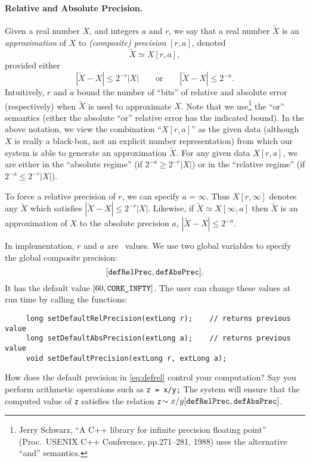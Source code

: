 \documentclass[12pt]{article}
\begin{document}
\paragraph{Relative and Absolute Precision.}
Given a real number $ X $, and integers $a$ and $r$, we say that a
real number $ \widetilde{X} $ is an
{\em approximation} of $X$ to {\em (composite) precision}
$ [r, a] $, denoted
\[
\widetilde{X} \simeq X \left[ r, a \right],
\]
provided either
\[
\left| \widetilde{X} - X \right| \le 2^{-r}\left| X \right|
	\qquad \mbox{or} \qquad
\left| \widetilde{X} - X \right| \le 2^{-a}.
\]
Intuitively, $r$ and $a$ bound the number of ``bits'' of relative and
absolute error (respectively) when $\widetilde{X}$ is used to approximate $X$.
Note that we use\footnote{
Jerry Schwarz, ``A C++ library for infinite precision
floating point'' (Proc.~USENIX C++ Conference, pp.271--281, 1988)
uses the alternative ``and'' semantics.
} the
``or'' semantics (either the absolute ``or'' relative error has the
indicated bound).  In the above notation, we view the combination
``$X[r,a]$'' as the given data (although $X$ is really a black-box,
not an explicit number representation)
from which our system is able to generate an approximation $\widetilde{X}$.
For any given data $X[r,a]$, we are either in the ``absolute regime''
(if $2^{-a}\ge 2^{-r}|X|$) or in the ``relative regime''
(if $2^{-a}\le 2^{-r}|X|$).

To force a relative precision of $ r $, we can
specify $a = \infty $.  Thus $ X[r, \infty]$ denotes any
$\widetilde{X}$ which satisfies
$\left| \widetilde{X} - X \right| \le 2^{-r}\left| X \right|$.
Likewise, if $ \widetilde{X} \simeq X[\infty, a] $ then $ \widetilde{X} $ is
an approximation of $ X $ to the absolute precision $a$,
$|\widetilde{X} - X| \le 2^{-a}$.

In implementation, $r$ and $a$ are \extlong\ values.
We use two global variables to specify the global composite precision:
	\begin{equation}\label{eq:defrel}
	[\mbox{\tt defRelPrec},\mbox{\tt defAbsPrec}].
	\end{equation}
It has the default value $[60,\mbox{\tt CORE\_INFTY}]$.
The user can change these values at run time by calling the functions:
\begin{verbatim}
     long setDefaultRelPrecision(extLong r);    // returns previous value
     long setDefaultAbsPrecision(extLong a);    // returns previous value
     void setDefaultPrecision(extLong r, extLong a);
\end{verbatim}

How does the default precision in \ref{eq:defrel} control your computation?
Say you perform arithmetic operations such as \texttt{z = x/y;}
The system will ensure that the computed value of
\texttt{z} satisfies the relation \texttt{z}$\sim x/y[\mbox{\tt defRelPrec},\mbox{\tt defAbsPrec}]$.
\end{document}
